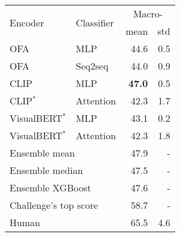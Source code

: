 \begin{tabular}{l l r r}
\toprule
	\multirow{2}{*}{Encoder} & \multirow{2}{*}{Classifier} & \multicolumn{2}{c}{Macro-\fone{}} \\
	\cmidrule(lr){3-4}
	& & \multicolumn{1}{c}{mean} & \multicolumn{1}{c}{std} \\
\midrule
	OFA & MLP & 44.6 & 0.5 \\
	OFA & Seq2seq & 44.0 & 0.9 \\
\midrule
	CLIP & MLP & \textbf{47.0} & 0.5 \\
	CLIP$^*$ & Attention & 42.3 & 1.7 \\
\midrule
    VisualBERT$^*$ & MLP & 43.1 & 0.2 \\
	VisualBERT$^*$ & Attention & 42.3 & 1.8 \\
\midrule
	\multicolumn{2}{l}{Ensemble mean   } & 47.9 & - \\
	\multicolumn{2}{l}{Ensemble median } & 47.5 & - \\
	\multicolumn{2}{l}{Ensemble XGBoost} & 47.6 & - \\
\midrule
	\multicolumn{2}{l}{Challenge's top score} & 58.7 & - \\
	\multicolumn{2}{l}{Human} & 65.5 & 4.6 \\
\bottomrule
\end{tabular}
